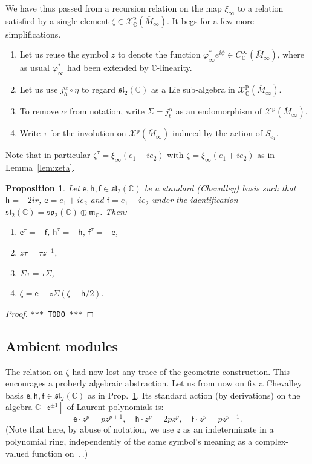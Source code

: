 \documentclass{article}
\def\MISS{\texttt{*** TODO ***}}
\def\fsl{\mathfrak{sl}}
\def\fso{\mathfrak{so}}
\def\fm{\mathfrak{m}}
\def\CC{\mathbb{C}}
\def\TT{\mathbb{T}}
\def\XX{\mathscr{X}}
\def\inv{\tau} %
\def\e{\mathsf{e}}
\def\h{\mathsf{h}}
\def\f{\mathsf{f}}
\def\p{\mathrm{p}}
\newtheorem{prop}{Proposition}
\theoremstyle{definition}
\begin{document}
We have thus passed from a recursion relation
on the map $\xi_\infty$ to a relation satisfied by 
a single element $\zeta \in \XX^\p_\CC(\overline M_\infty)$.
It begs for a few more simplifications.
\begin{enumerate}
        \item Let us reuse the symbol $z$ to denote the function
$\varphi^*_\infty e^{i\phi} \in C^\infty_\CC(\overline M_\infty)$,
where as usual $\varphi^*_\infty$ had been extended
by $\CC$-linearity. 
\item Let us
use $j^\alpha_h \circ \eta$ to regard 
$\fsl_2(\CC)$ as a Lie sub-algebra in $\XX^\p_\CC(\overline M_\infty)$.
\item 
To remove $\alpha$ from notation, write $\Sigma = j^\alpha_t$ as an endomorphism of $\XX^\p(\overline M_\infty)$.
\item
        Write $\inv$ for the involution on $\XX^\p(\overline M_\infty)$
        induced by the action of $S_{e_1}$.
\end{enumerate}
Note that in particular $\zeta^\inv = \xi_\infty(e_1 - ie_2)$
with $\zeta = \xi_\infty(e_1+ie_2)$ as in Lemma~\ref{lem:zeta}.
\begin{prop}\label{prop:zeta}
        Let $\e,\h,\f \in \fsl_2(\CC)$ be a standard (Chevalley) basis
        such that $\h = -2ir$, $\e = e_1 + ie_2$ and $\f = e_1 - ie_2$ under the identification
        $\fsl_2(\CC) = \fso_2(\CC) \oplus \fm_\CC$. 
        Then:
        \begin{enumerate}
                \item $\e^\inv=-\f$, $\h^\inv=-\h$, $\f^\inv=-\e$,
                \item $z\inv = \inv z^{-1}$,
                \item $\Sigma\inv = \inv\Sigma$,
                \item $\zeta = \e + z\Sigma(\zeta - \h/2)$.
        \end{enumerate}
\end{prop}
\begin{proof}
        \MISS
\end{proof}

\subsection{Ambient modules}
The relation on $\zeta$ 
had now lost any trace
of the geometric construction. This encourages
a proberly algebraic abstraction. Let us from now on fix
a Chevalley basis $\e,\h,\f \in \fsl_2(\CC)$ as in 
Prop.~\ref{prop:zeta}. Its standard action
(by derivations) on the algebra $\CC[z^{\pm1}]$ of Laurent polynomials is:
$$ \e\cdot z^p=pz^{p+1},\quad \h\cdot z^p=2pz^p,\quad \f\cdot z^p=pz^{p-1}. $$ 
(Note that here, by abuse of notation, we use $z$ as an indeterminate in a polynomial ring,
independently of the same symbol's meaning as a complex-valued function on $\TT$.)
\end{document}
